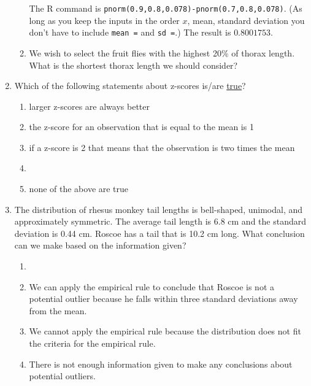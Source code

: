 \documentclass[12pt,fullpage]{amsart}
\begin{document}
\begin{enumerate}
\begin{enumerate}
{    The R command is \texttt{pnorm(0.9,0.8,0.078)-pnorm(0.7,0.8,0.078)}. (As long as you keep the inputs in the order $x$, mean, standard deviation you don't have to include \texttt{mean =} and \texttt{sd =}.)  The result is $0.8001753$.}
    
  \item We wish to select the fruit flies with the highest 20\% of
    thorax length.  What is the shortest thorax length we should
    consider?
    
    
  \end{enumerate}

  \vfill

\item Which of the following statements about z-scores is/are \underline{true}?
\begin{enumerate}
\item	larger z-scores are always better
\item	the z-score for an observation that is equal to the mean is 1
\item	if a z-score is 2 that means that the observation is two times the mean
\item	{}
\item   none of the above are true
\end{enumerate}


\vfill

\item
The distribution of rhesus monkey tail lengths is bell-shaped, unimodal, and approximately symmetric.  The average tail length is 6.8 cm and the standard deviation is 0.44 cm.  Roscoe has a tail that is 10.2 cm long.  What conclusion can we make based on the information given?
\begin{enumerate}
    \item
    \item
	We can apply the empirical rule to conclude that Roscoe is not a potential outlier because he falls within three standard deviations away from the mean.
    \item
	We cannot apply the empirical rule because the distribution does not fit the criteria for the empirical rule.
    \item
      There is not enough information given to make any conclusions about potential outliers.


\end{enumerate}
\end{enumerate}
\end{document}
